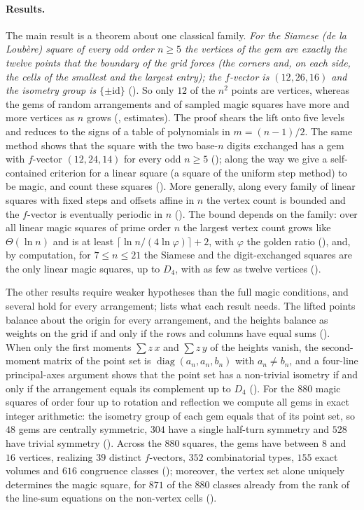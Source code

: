 \paragraph{Results.}
The main result is a theorem about one classical family.
\emph{For the Siamese (de la Loub\`ere) square of every odd order $n\ge5$ the vertices of the gem are exactly the twelve points that the boundary of the grid forces (the corners and, on each side, the cells of the smallest and the largest entry); the $f$-vector is $(12,26,16)$ and the isometry group is $\{\pm\mathrm{id}\}$} ().
So only $12$ of the $n^2$ points are vertices, whereas the gems of random arrangements and of sampled magic squares have more and more vertices as $n$ grows (, estimates).
The proof shears the lift onto five levels and reduces to the signs of a table of polynomials in $m=(n-1)/2$.
The same method shows that the square with the two base-$n$ digits exchanged has a gem with $f$-vector $(12,24,14)$ for every odd $n\ge5$ (); along the way we give a self-contained criterion for a linear square (a square of the uniform step method) to be magic, and count these squares ().
More generally, along every family of linear squares with fixed steps and offsets affine in $n$ the vertex count is bounded and the $f$-vector is eventually periodic in $n$ ().
The bound depends on the family: over all linear magic squares of prime order $n$ the largest vertex count grows like $\Theta(\ln n)$ and is at least $\lceil\ln n/(4\ln\varphi)\rceil+2$, with $\varphi$ the golden ratio (), and, by computation, for $7\le n\le21$ the Siamese and the digit-exchanged squares are the only linear magic squares, up to $D_4$, with as few as twelve vertices ().

The other results require weaker hypotheses than the full magic conditions, and several hold for every arrangement;  lists what each result needs.
The lifted points balance about the origin for every arrangement, and the heights balance as weights on the grid if and only if the rows and columns have equal sums ().
When only the first moments $\sum z\,x$ and $\sum z\,y$ of the heights vanish, the second-moment matrix of the point set is $\operatorname{diag}(a_n,a_n,b_n)$ with $a_n\ne b_n$, and a four-line principal-axes argument shows that the point set has a non-trivial isometry if and only if the arrangement equals its complement up to $D_4$ ().
For the $880$ magic squares of order four up to rotation and reflection we compute all gems in exact integer arithmetic: the isometry group of each gem equals that of its point set, so $48$ gems are centrally symmetric, $304$ have a single half-turn symmetry and $528$ have trivial symmetry (). Across the $880$ squares, the gems have between $8$ and $16$ vertices, realizing $39$ distinct $f$-vectors, $352$ combinatorial types, $155$ exact volumes and $616$ congruence classes (); moreover, the vertex set alone uniquely determines the magic square, for $871$ of the $880$ classes already from the rank of the line-sum equations on the non-vertex cells ().

